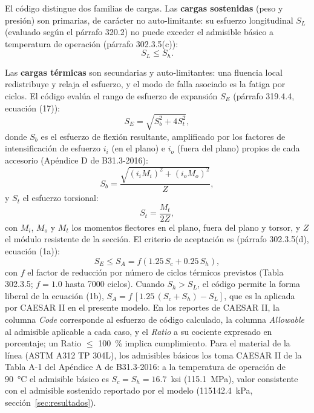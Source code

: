 El c\'{o}digo distingue dos familias de cargas. Las \textbf{cargas sostenidas}
(peso y presi\'{o}n) son primarias, de car\'{a}cter no auto-limitante: su esfuerzo
longitudinal $S_L$ (evaluado seg\'{u}n el p\'{a}rrafo 320.2) no puede exceder el
admisible b\'{a}sico a temperatura de operaci\'{o}n (p\'{a}rrafo 302.3.5(c)):
\begin{equation}
    S_L \leq S_h.
    \label{eq:sl}
\end{equation}

Las \textbf{cargas t\'{e}rmicas} son secundarias y auto-limitantes: una fluencia
local redistribuye y relaja el esfuerzo, y el modo de falla asociado es la fatiga
por ciclos. El c\'{o}digo eval\'{u}a el rango de esfuerzo de expansi\'{o}n $S_E$
(p\'{a}rrafo 319.4.4, ecuaci\'{o}n (17)):
\begin{equation}
    S_E = \sqrt{S_b^2 + 4 S_t^2},
    \label{eq:se}
\end{equation}
donde $S_b$ es el esfuerzo de flexi\'{o}n resultante, amplificado por los
factores de intensificaci\'{o}n de esfuerzo $i_i$ (en el plano) e $i_o$ (fuera del
plano) propios de cada accesorio (Ap\'{e}ndice D de B31.3-2016):
\begin{equation}
    S_b = \frac{\sqrt{(i_i M_i)^2 + (i_o M_o)^2}}{Z},
    \label{eq:sb}
\end{equation}
y $S_t$ el esfuerzo torsional:
\begin{equation}
    S_t = \frac{M_t}{2 Z},
    \label{eq:st}
\end{equation}
con $M_i$, $M_o$ y $M_t$ los momentos flectores en el plano, fuera del plano y
torsor, y $Z$ el m\'{o}dulo resistente de la secci\'{o}n. El criterio de
aceptaci\'{o}n es (p\'{a}rrafo 302.3.5(d), ecuaci\'{o}n (1a)):
\begin{equation}
    S_E \leq S_A = f \left( 1.25 \, S_c + 0.25 \, S_h \right),
    \label{eq:sa}
\end{equation}
con $f$ el factor de reducci\'{o}n por n\'{u}mero de ciclos t\'{e}rmicos previstos
(Tabla 302.3.5; $f = 1.0$ hasta 7000 ciclos). Cuando $S_h > S_L$, el c\'{o}digo
permite la forma liberal de la ecuaci\'{o}n (1b),
$S_A = f\,[1.25\,(S_c + S_h) - S_L]$, que es la aplicada por CAESAR II en el
presente modelo. En los reportes de CAESAR II, la columna \textit{Code}
corresponde al esfuerzo de c\'{o}digo calculado, la columna \textit{Allowable} al
admisible aplicable a cada caso, y el \textit{Ratio} a su cociente expresado en
porcentaje; un Ratio $\leq$ 100~\% implica cumplimiento. Para el material de la
l\'{i}nea (ASTM A312 TP 304L), los admisibles b\'{a}sicos los toma CAESAR II de
la Tabla A-1 del Ap\'{e}ndice A de B31.3-2016: a la temperatura de
operaci\'{o}n de 90~\si{\celsius} el admisible b\'{a}sico es
$S_c = S_h = 16.7$~ksi (\num{115.1}~\si{MPa}), valor consistente con el
admisible sostenido reportado por el modelo (\num{115142.4}~\si{kPa},
secci\'{o}n~\ref{sec:resultados}).


